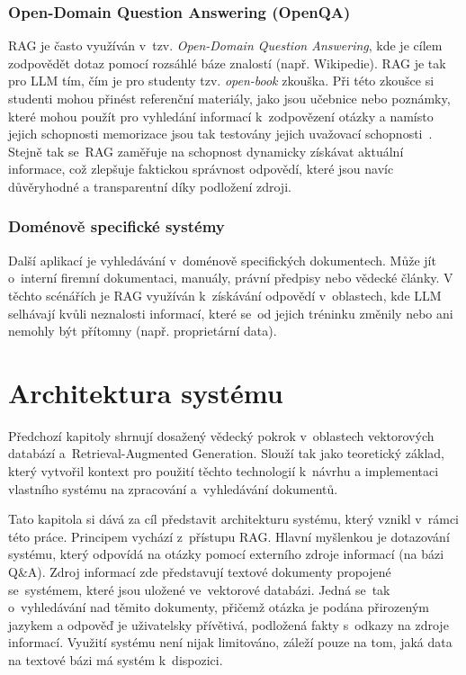 \subsection{Open-Domain Question Answering (OpenQA)}
RAG je často využíván v~tzv. \textit{Open-Domain Question Answering}, kde je cílem zodpovědět dotaz pomocí rozsáhlé báze znalostí (např. Wikipedie). RAG je tak pro LLM tím, čím je pro studenty tzv. \textit{open-book} zkouška. Při této zkoušce si studenti mohou přinést referenční materiály, jako jsou učebnice nebo poznámky, které mohou použít pro vyhledání informací k~zodpovězení otázky a namísto jejich schopnosti memorizace jsou tak testovány jejich uvažovací schopnosti~\cite{rag_openQA}. Stejně tak se~RAG zaměřuje na schopnost dynamicky získávat aktuální informace, což zlepšuje faktickou správnost odpovědí, které jsou navíc důvěryhodné a transparentní díky podložení zdroji. 

\subsection{Doménově specifické systémy}
Další aplikací je vyhledávání v~doménově specifických dokumentech. Může jít o~interní firemní dokumentaci, manuály, právní předpisy nebo vědecké články. V těchto scénářích je RAG využíván k~získávání odpovědí v~oblastech, kde LLM selhávají kvůli neznalosti informací, které se~od jejich tréninku změnily nebo ani nemohly být přítomny (např. proprietární data).



\chapter{Architektura systému}
\label{navrh}
Předchozí kapitoly shrnují dosažený vědecký pokrok v~oblastech vektorových databází a~Retrieval-Augmented Generation. Slouží tak jako teoretický základ, který vytvořil kontext pro použití těchto technologií k~návrhu a implementaci vlastního systému na zpracování a~vyhledávání dokumentů. 

Tato kapitola si dává za cíl představit architekturu systému, který vznikl v~rámci této práce. Principem vychází z~přístupu RAG. Hlavní myšlenkou je dotazování systému, který odpovídá na otázky pomocí externího zdroje informací (na bázi Q\&A). Zdroj informací zde představují textové dokumenty propojené se~systémem, které jsou uložené ve~vektorové databázi. Jedná se~tak o~vyhledávání nad těmito dokumenty, přičemž otázka je podána přirozeným jazykem a odpověď je uživatelsky přívětivá, podložená fakty s~odkazy na zdroje informací. Využití systému není nijak limitováno, záleží pouze na tom, jaká data na textové bázi má systém k~dispozici.

